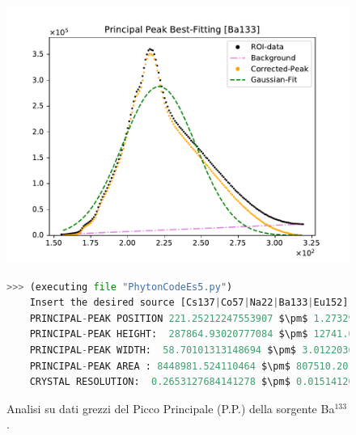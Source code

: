 \begin{figure}[h!]
	\centering
	\caption{Analisi su dati grezzi del Picco Principale (P.P.) della sorgente Ba$^{133}$. }
	\includegraphics[width =  \textwidth,trim={1cm 0 1cm 0}, clip]{Immagini/Peak-Fitting_Ba133_RAW.pdf}
	\label{fig:PPRawBa133} \bigskip\bigskip
	\begin{lstlisting}[language=python, style=Pystyle, mathescape=true]
	>>> (executing file "PhytonCodeEs5.py")
	Insert the desired source [Cs137|Co57|Na22|Ba133|Eu152]: Ba133
	PRINCIPAL-PEAK POSITION 221.25212247553907 $\pm$ 1.2732933530258672
	PRINCIPAL-PEAK HEIGHT:  287864.93020777084 $\pm$ 12741.050893987342
	PRINCIPAL-PEAK WIDTH:  58.70101313148694 $\pm$ 3.0122036998891812
	PRINCIPAL-PEAK AREA : 8448981.524110464 $\pm$ 807510.2018385414
	CRYSTAL RESOLUTION:  0.2653127684141278 $\pm$ 0.01514120925440681
	\end{lstlisting} \bigskip\bigskip
\end{figure}

\newpage

